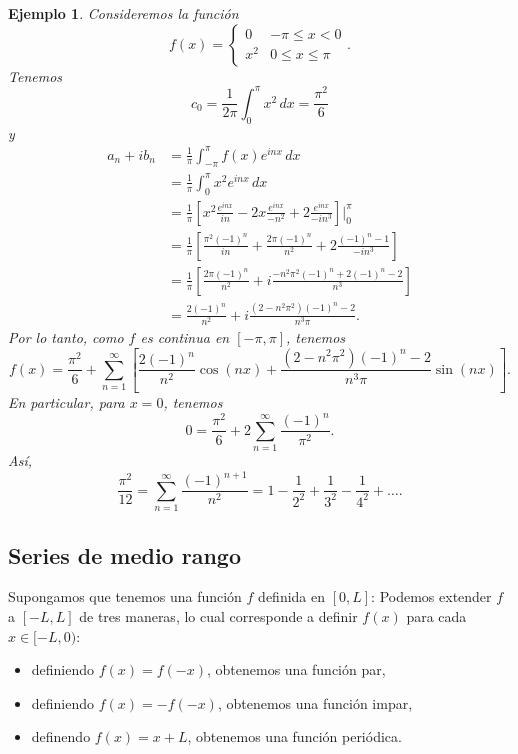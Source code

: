 \documentclass[11pt,letterpaper]{report}
\newtheorem{example}[defn]{Ejemplo}
\newcommand\<{\langle}
\renewcommand\>{\rangle}
\begin{document}
\begin{example}
  Consideremos la función
  \[
    f(x) =
    \begin{cases}
      0 & -\pi\leq x<0 \\
      x^{2} & 0\leq x\leq\pi
    \end{cases}
  .\]
  Tenemos
  \[
    c_0 = \frac{1}{2\pi}\int_{0}^{\pi}x^{2}\,dx = \frac{\pi^{2}}{6}
  \]
  y
  \begin{align*}
    a_n+ib_n
    &= \frac{1}{\pi}\int_{-\pi}^{\pi}f(x)e^{inx}\,dx \\
    &= \frac{1}{\pi}\int_{0}^{\pi}x^{2}e^{inx}\,dx \\
    &= \frac{1}{\pi}
    \left[
      x^{2}\frac{e^{inx}}{in}
      -
      2x\frac{e^{inx}}{-n^{2}}
      +
      2\frac{e^{inx}}{-in^{3}}
    \right]\Big|_{0}^{\pi}
    \\
    &= \frac{1}{\pi}
    \left[
      \frac{\pi^{2}(-1)^{n}}{in}
      +
      \frac{2\pi(-1)^{n}}{n^{2}}
      +
      2\frac{(-1)^{n}-1}{-in^{3}}
    \right]
    \\
    &= \frac{1}{\pi}
    \left[
      \frac{2\pi(-1)^{n}}{n^{2}}
      +
      i\frac{-n^{2}\pi^{2}(-1)^{n}+2(-1)^{n}-2}{n^{3}}
    \right] \\
    &=
      \frac{2(-1)^{n}}{n^{2}}
      +
      i\frac{(2-n^{2}\pi^{2})(-1)^{n}-2}{n^{3}\pi}.
  \end{align*}
  Por lo tanto, como $f$ es continua en $[-\pi,\pi]$, tenemos
  \[
    f(x)
    =
    \frac{\pi^{2}}{6}
    +
    \sum_{n=1}^{\infty} \left[
      \frac{2(-1)^{n}}{n^{2}}\cos(nx)
      +
      \frac{(2-n^{2}\pi^{2})(-1)^{n}-2}{n^{3}\pi}
      \sin(nx)
    \right]
  .\]
  En particular, para $x=0$, tenemos
  \[
    0
    =
    \frac{\pi^{2}}{6}
    +
    2\sum_{n=1}^{\infty}\frac{(-1)^{n}}{\pi^{2}}
  .\]
  Así,
  \[
    \frac{\pi^{2}}{12}
    =
    \sum_{n=1}^{\infty}\frac{(-1)^{n+1}}{n^{2}}
    =
    1-\frac{1}{2^{2}}+\frac{1}{3^{2}}-\frac{1}{4^{2}}+\dots
  .\]
\end{example}

\subsection{Series de medio rango}

Supongamos que tenemos una función $f$ definida en $[0,L]$:
Podemos extender $f$ a $[-L,L]$ de tres maneras, lo cual corresponde a
definir $f(x)$ para cada $x\in[-L,0)$:
\begin{itemize}
  \item definiendo $f(x)=f(-x)$, obtenemos una función par,
  \item definiendo $f(x)=-f(-x)$, obtenemos una función impar,
  \item definendo $f(x)=x+L$, obtenemos una función periódica.
\end{itemize}
\end{document}

